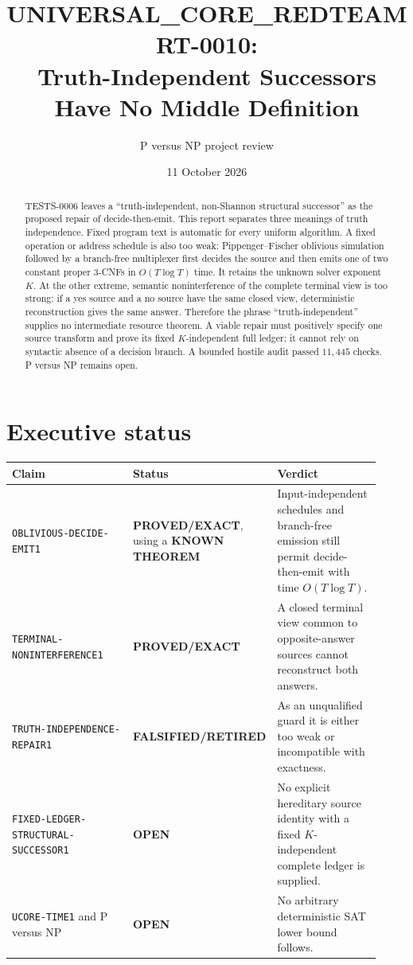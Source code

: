 \documentclass[11pt]{article}
\title{UNIVERSAL\_CORE\_REDTEAM RT-0010:\\
Truth-Independent Successors Have No Middle Definition}
\author{P versus NP project review}
\date{11 October 2026}
\newcommand{\EXACT}{\textbf{PROVED/EXACT}}
\newcommand{\KNOWN}{\textbf{KNOWN THEOREM}}
\newcommand{\OPEN}{\textbf{OPEN}}
\newcommand{\RETIRED}{\textbf{FALSIFIED/RETIRED}}
\begin{document}
\maketitle

\begin{abstract}
TESTS-0006 leaves a ``truth-independent, non-Shannon structural successor''
as the proposed repair of decide-then-emit.  This report separates three
meanings of truth independence.  Fixed program text is automatic for every
uniform algorithm.  A fixed operation or address schedule is also too weak:
Pippenger--Fischer oblivious simulation followed by a branch-free multiplexer
first decides the source and then emits one of two constant proper 3-CNFs in
$O(T\log T)$ time.  It retains the unknown solver exponent $K$.  At the other
extreme, semantic noninterference of the complete terminal view is too strong:
if a yes source and a no source have the same closed view, deterministic
reconstruction gives the same answer.  Therefore the phrase
``truth-independent'' supplies no intermediate resource theorem.  A viable
repair must positively specify one source transform and prove its fixed
$K$-independent full ledger; it cannot rely on syntactic absence of a decision
branch.  A bounded hostile audit passed $11{,}445$ checks.  P versus NP
remains open.
\end{abstract}

\section{Executive status}

\begin{center}
\small
\begin{tabular}{p{0.34\linewidth}p{0.28\linewidth}p{0.30\linewidth}}
\toprule
Claim & Status & Verdict\\
\midrule
\texttt{OBLIVIOUS-DECIDE-}\allowbreak\texttt{EMIT1} & \EXACT, using a \KNOWN &
Input-independent schedules and branch-free emission still permit
decide-then-emit with time $O(T\log T)$.\\
\texttt{TERMINAL-}\allowbreak\texttt{NONINTERFERENCE1} & \EXACT &
A closed terminal view common to opposite-answer sources cannot reconstruct
both answers.\\
\texttt{TRUTH-}\newline\texttt{INDEPENDENCE-}\newline\texttt{REPAIR1} & \RETIRED &
As an unqualified guard it is either too weak or incompatible with exactness.\\
\texttt{FIXED-LEDGER-}\allowbreak\texttt{STRUCTURAL-SUCCESSOR1} & \OPEN &
No explicit hereditary source identity with a fixed $K$-independent complete
ledger is supplied.\\
\texttt{UCORE-TIME1} and P versus NP & \OPEN &
No arbitrary deterministic SAT lower bound follows.\\
\bottomrule
\end{tabular}
\end{center}
\end{document}
